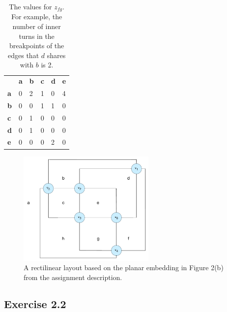 \documentclass[12pt]{article}
\begin{document}
  \begin{table}[h]
    \centering
    \begin{tabular}{llllll}
                                    & \textbf{a} & \textbf{b} & \textbf{c} & \textbf{d} & \textbf{e} \\ \cline{2-6}
    \multicolumn{1}{l|}{\textbf{a}} & 0          & 2          & 1          & 0          & 4          \\
    \multicolumn{1}{l|}{\textbf{b}} & 0          & 0          & 1          & 1          & 0          \\
    \multicolumn{1}{l|}{\textbf{c}} & 0          & 1          & 0          & 0          & 0          \\
    \multicolumn{1}{l|}{\textbf{d}} & 0          & 1          & 0          & 0          & 0          \\
    \multicolumn{1}{l|}{\textbf{e}} & 0          & 0          & 0          & 2          & 0
    \end{tabular}
    \caption{The values for $z_{fg}$. For example, the number of inner turns in the breakpoints of the edges that $d$ shares with $b$ is 2.}
    \label{table:values_zfg}
  \end{table}

  \begin{figure}[h]
    \centering
      \includegraphics[width=0.6\textwidth]{figures/e2_1}
    \caption{A rectilinear layout based on the planar embedding in Figure 2(b) from the assignment description.}
    \label{fig:e2_1}
  \end{figure}


\subsection*{Exercise 2.2}
\end{document}
